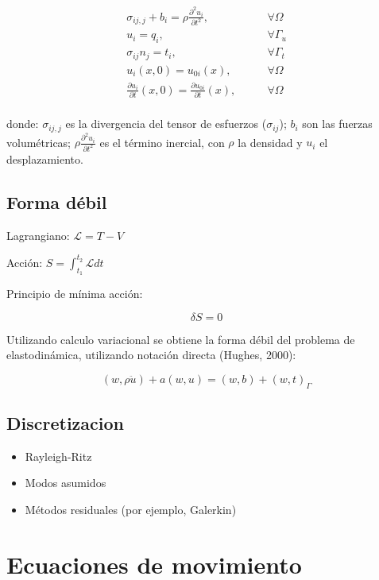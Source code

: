 \begin{align}
    \sigma_{ij,j} + b_i = \rho\frac{\partial^2 u_i}{\partial t^2}, & \qquad \forall \Omega\\
    u_i = q_i, & \qquad \forall \Gamma_u\\
    \sigma_{ij} n_j = t_i, & \qquad \forall \Gamma_t\\
    u_i(x,0) = u_{0i}(x), & \qquad \forall \Omega\\
    \frac{\partial u_i}{\partial t}(x,0) =\frac{\partial u_{0i}}{\partial t}(x), & \qquad \forall \Omega\\
\end{align}

donde: $\sigma_{ij,j}$ es la divergencia del tensor de esfuerzos ($\sigma_{ij}$); $b_i$ son las fuerzas volumétricas; $\rho \frac{\partial^2 u_i}{\partial t^2}$ es el término inercial, con $\rho$ la densidad y $u_i$ el desplazamiento.

\subsection{Forma débil}

Lagrangiano: $\mathcal{L} = T-V$

Acción: $S = \int_{t_1}^{t_2} \mathcal{L}dt$

Principio de mínima acción: 

\begin{equation}
    \delta S = 0
\end{equation}

Utilizando calculo variacional se obtiene la forma débil del problema de elastodinámica, utilizando notación directa (Hughes, 2000):

\begin{equation}
    (w,\rho \ddot{u}) + a(w,u) = (w,b) + (w,t)_\Gamma
\end{equation}

\subsection{Discretizacion}

\begin{itemize}
    \item Rayleigh-Ritz
    \item Modos asumidos
    \item Métodos residuales (por ejemplo, Galerkin)
\end{itemize}

\section{Ecuaciones de movimiento}


